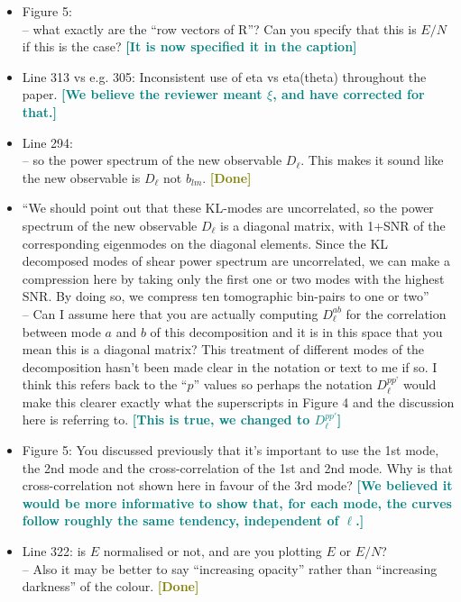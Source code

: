 \documentclass{article}
\newcommand\reply[1]{{\bf {\textcolor{teal}{[#1]}}}}
\newcommand\done{{\bf {\textcolor{olive}{[Done]}}}}
\begin{document}
\begin{itemize}
		\item Figure 5: \\ 
		– what exactly are the “row vectors of R”? Can you specify that this is $E/N$ if this is the case? \reply{It is now specified it in the caption}
		
		\item Line 313 vs e.g. 305: Inconsistent use of eta vs eta(theta) throughout the paper. \reply{We believe the reviewer meant $\xi$, and have corrected for that.}
		\item Line 294: \\ 
		– so the power spectrum of the new observable $D_\ell$. This makes it sound like the new observable is $D_\ell$ not $b_{lm}$. \done
		
		\item “We should point out that these KL-modes are uncorrelated, so the power spectrum of the new observable $D_\ell$ is a diagonal matrix, with 1+SNR of the corresponding eigenmodes on the diagonal elements. Since the KL decomposed modes of shear power spectrum are uncorrelated, we can make a compression here by taking only the first one or two modes with the highest SNR. By doing so, we compress ten tomographic bin-pairs to one or two” \\ 
		– Can I assume here that you are actually computing $D^{ab}_\ell$ for the correlation between mode $a$ and $b$ of this decomposition and it is in this space that you mean this is a diagonal matrix? This treatment of different modes of the decomposition hasn’t been made clear in the notation or text to me if so. I think this refers back to the “$p$” values so perhaps the notation $D^{p p’}_\ell$ would make this clearer exactly what the superscripts in Figure 4 and the discussion here is referring to. \reply{This is true, we changed to $D^{pp'}_{\ell}$}
		
		\item Figure 5: You discussed previously that it’s important to use the 1st mode, the 2nd mode and the cross-correlation of the 1st and 2nd mode. Why is that cross-correlation not shown here in favour of the 3rd mode? \reply{We believed it would be more informative to show that, for each mode, the curves follow roughly the same tendency, independent of $\ell$.} %
		
		\item Line 322: is $E$ normalised or not, and are you plotting $E$ or $E/N$? \\ 
		– Also it may be better to say “increasing opacity” rather than “increasing darkness” of the colour. \done
		

\end{itemize}
\end{document}
